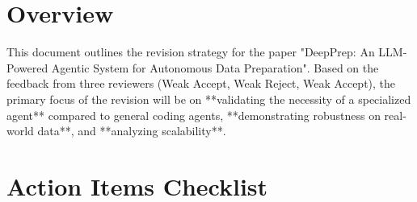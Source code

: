 \section*{Overview}
This document outlines the revision strategy for the paper "DeepPrep: An LLM-Powered Agentic System for Autonomous Data Preparation". Based on the feedback from three reviewers (Weak Accept, Weak Reject, Weak Accept), the primary focus of the revision will be on **validating the necessity of a specialized agent** compared to general coding agents, **demonstrating robustness on real-world data**, and **analyzing scalability**.

\section{Action Items Checklist}

